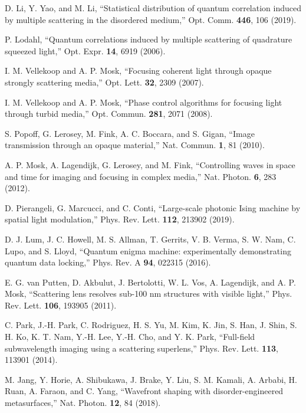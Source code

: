 \documentclass[9pt,twocolumn,twoside]{osajnl}
\begin{document}
\begin{thebibliography}{99}
 D. Li, Y. Yao, and M. Li, \enquote{Statistical distribution of quantum correlation induced by multiple scattering
in the disordered medium,} Opt. Comm. \textbf{446}, 106 (2019).

 P. Lodahl, \enquote{Quantum correlations induced by multiple scattering of quadrature squeezed light,} Opt. Expr. \textbf{14}, 6919 (2006).

 I. M. Vellekoop and A. P. Mosk, \enquote{Focusing coherent light through opaque strongly scattering media,} Opt. Lett. \textbf{32}, 2309 (2007).

 I. M. Vellekoop and A. P. Mosk, \enquote{Phase control algorithms for focusing light through turbid media,} Opt. Commun. \textbf{281}, 2071 (2008).

 S. Popoff, G. Lerosey, M. Fink, A. C. Boccara, and S. Gigan, \enquote{Image transmission through an opaque material,} Nat. Commun. \textbf{1}, 81 (2010).



 A. P. Mosk, A. Lagendijk, G. Lerosey, and M. Fink, \enquote{Controlling waves in space and time for imaging and focusing in complex media,} Nat. Photon. \textbf{6}, 283 (2012).


 D. Pierangeli, G. Marcucci, and C. Conti, \enquote{Large-scale photonic Ising machine by spatial light modulation,} Phys. Rev. Lett. \textbf{112}, 213902 (2019).


 D. J. Lum, J. C. Howell, M. S. Allman, T. Gerrits, V. B. Verma, S. W. Nam, C. Lupo, and S. Lloyd, \enquote{Quantum enigma machine: experimentally demonstrating quantum data locking,} Phys. Rev. A \textbf{94}, 022315 (2016).

 E. G. van Putten, D. Akbulut, J. Bertolotti, W. L. Vos, A. Lagendijk, and A. P. Mosk, \enquote{Scattering lens resolves sub-100 nm structures with visible light,} Phys. Rev. Lett. \textbf{106}, 193905 (2011).


 C. Park, J.-H. Park, C. Rodriguez, H. S. Yu, M. Kim, K. Jin, S. Han, J. Shin, S. H. Ko, K. T. Nam, Y.-H. Lee, Y.-H. Cho, and Y. K. Park, \enquote{Full-field subwavelength imaging using a scattering superlens,} Phys. Rev. Lett. \textbf{113}, 113901 (2014).

 M. Jang, Y. Horie, A. Shibukawa, J. Brake, Y. Liu, S. M. Kamali, A. Arbabi, H. Ruan, A. Faraon, and C. Yang, \enquote{Wavefront shaping with disorder-engineered metasurfaces,} Nat. Photon. \textbf{12}, 84 (2018). 


\end{thebibliography}
\end{document}
